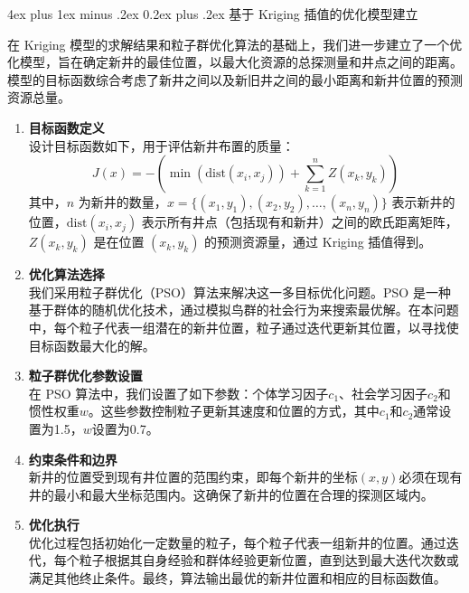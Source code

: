 \documentclass[12pt,a4paper]{nmmcm}
\makeatletter
\renewcommand\subsubsection{\@startsection{subsubsection}{3}{1em}%
  {4ex plus 1ex minus .2ex}%
  {0.2ex plus .2ex}%
  {\normalfont\large\bfseries}}
\makeatother
\begin{document}
\subsubsection{基于 Kriging 插值的优化模型建立}

在 Kriging 模型的求解结果和粒子群优化算法的基础上，我们进一步建立了一个优化模型，旨在确定新井的最佳位置，以最大化资源的总探测量和井点之间的距离。模型的目标函数综合考虑了新井之间以及新旧井之间的最小距离和新井位置的预测资源总量。

\begin{enumerate}
  \item \textbf{目标函数定义} \\
        设计目标函数如下，用于评估新井布置的质量：
        \[
          J(x) = -\left(\min(\text{dist}(x_i, x_j)) + \sum_{k=1}^{n} Z(x_k, y_k)\right)
        \]
        其中，$n$ 为新井的数量，$x = \{(x_1, y_1), (x_2, y_2), \ldots, (x_{n}, y_{n})\}$ 表示新井的位置，$\text{dist}(x_i, x_j)$ 表示所有井点（包括现有和新井）之间的欧氏距离矩阵，$Z(x_k, y_k)$ 是在位置 $(x_k, y_k)$ 的预测资源量，通过 Kriging 插值得到。

  \item \textbf{优化算法选择} \\
        我们采用粒子群优化（PSO）算法来解决这一多目标优化问题。PSO 是一种基于群体的随机优化技术，通过模拟鸟群的社会行为来搜索最优解。在本问题中，每个粒子代表一组潜在的新井位置，粒子通过迭代更新其位置，以寻找使目标函数最大化的解。

  \item \textbf{粒子群优化参数设置} \\
        在 PSO 算法中，我们设置了如下参数：个体学习因子$c_1$、社会学习因子$c_2$和惯性权重$w$。这些参数控制粒子更新其速度和位置的方式，其中$c_1$和$c_2$通常设置为1.5，$w$设置为0.7。

  \item \textbf{约束条件和边界} \\
        新井的位置受到现有井位置的范围约束，即每个新井的坐标$(x, y)$必须在现有井的最小和最大坐标范围内。这确保了新井的位置在合理的探测区域内。

  \item \textbf{优化执行} \\
        优化过程包括初始化一定数量的粒子，每个粒子代表一组新井的位置。通过迭代，每个粒子根据其自身经验和群体经验更新位置，直到达到最大迭代次数或满足其他终止条件。最终，算法输出最优的新井位置和相应的目标函数值。
\end{enumerate}
\end{document}
